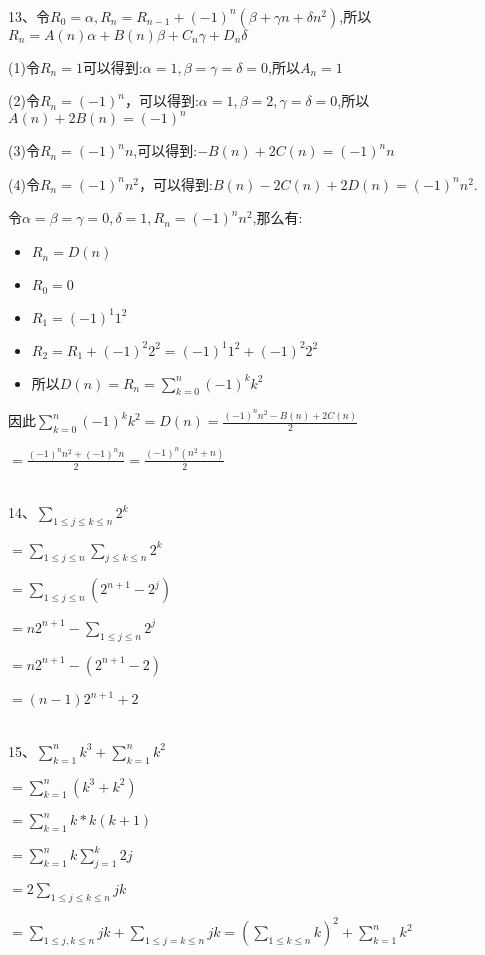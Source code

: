 \documentclass[onecolumn]{article}
\begin{document}
~\\
13、令$R_{0}=\alpha,R_{n}=R_{n-1}+(-1)^{n}(\beta+\gamma n+\delta n^{2})$,所以$R_{n}=A(n)\alpha+B(n)\beta+C_{n}\gamma +D_{n}\delta $ \par
(1)令$R_{n}=1$可以得到:$\alpha=1,\beta=\gamma =\delta =0$,所以$A_{n}=1$ \par
(2)令$R_{n}=(-1)^{n}$，可以得到:$\alpha=1,\beta=2,\gamma=\delta=0$,所以$A(n)+2B(n)=(-1)^{n}$ \par
(3)令$R_{n}=(-1)^{n}n$,可以得到:$-B(n)+2C(n)=(-1)^{n}n$ \par
(4)令$R_{n}=(-1)^{n}n^{2}$，可以得到:$B(n)-2C(n)+2D(n)=(-1)^{n}n^{2}$. \par
令$\alpha=\beta=\gamma=0,\delta=1,R_{n}=(-1)^{n}n^{2}$,那么有:\par
\begin{itemize}
	\item $R_{n}=D(n)$
	\item $R_{0}=0$
	\item $R_{1}=(-1)^{1}1^{2}$
	\item $R_{2}=R_{1}+(-1)^{2}2^{2}=(-1)^{1}1^{2}+(-1)^{2}2^{2}$
	\item 所以$D(n)=R_{n}=\sum_{k=0}^{n}(-1)^{k}k^{2}$
\end{itemize}
因此$\sum_{k=0}^{n}(-1)^{k}k^{2}=D(n)=\frac{(-1)^{n}n^{2}-B(n)+2C(n)}{2}$\par
$=\frac{(-1)^{n}n^{2}+(-1)^{n}n}{2}=\frac{(-1)^{n}(n^{2}+n)}{2}$\par
~\\
14、$\sum_{1\leq j \leq k \leq n}2^{k}$\par
$=\sum_{1\leq j \leq n}\sum_{j\leq k \leq n}2^{k}$\par
$=\sum_{1\leq j \leq n}(2^{n+1}-2^{j})$\par
$=n2^{n+1}-\sum_{1\leq j \leq n}2^{j}$\par
$=n2^{n+1}-(2^{n+1}-2)$\par
$=(n-1)2^{n+1}+2$\par
~\\
15、$\sum_{k=1}^{n}k^{3}+\sum_{k=1}^{n}k^{2}$ \par
$=\sum_{k=1}^{n}(k^{3}+k^{2})$\par
$=\sum_{k=1}^{n}k*k(k+1)$\par
$=\sum_{k=1}^{n}k\sum_{j=1}^{k}2j$\par
$=2\sum_{1\leq j \leq k \leq n}jk$\par
$=\sum_{1\leq j,k \leq n}jk+\sum_{1\leq j=k \leq n}jk=\left (\sum_{1\leq k \leq n}k  \right )^{2}+\sum_{k=1}^{n}k^{2}$\par
\end{document}
